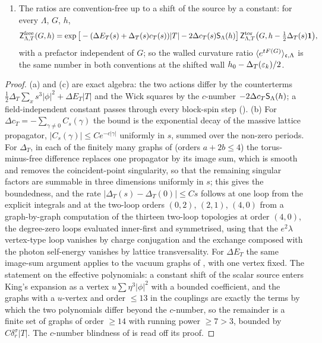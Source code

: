 \begin{proposition}
\begin{enumerate}[label=\textup{(\alph*)},leftmargin=*]
\item The ratios are convention-free up to a shift of the source by a constant: for every $\Lambda$, $G$, $h$,
\[
\mathsf Z^{\rm free}_{\Lambda,T}(G,h)=\exp\big[-(\Delta E_T(s)+\Delta_T(s)c_T(s))|T|-2\Delta c_T(s)\mathsf S_\Lambda(h)\big]\,\mathsf Z^{\rm tor}_{\Lambda,T}\big(G,h-\tfrac12\Delta_T(s)\mathbf 1\big),
\]
with a prefactor independent of $G$; so the walled curvature ratio $\langle e^{tF(G)}\rangle_{\mathfrak c,\Lambda}$ is the same number in both conventions at the shifted wall $h_0-\Delta_T(\varepsilon_k)/2$.
\end{enumerate}
\end{proposition}
\begin{proof}
(a) and (c) are exact algebra: the two actions differ by the counterterms $\frac12\Delta_T\sum_xs^3|\phi|^2+\Delta E_T|T|$ and the Wick squares by the $c$-number $-2\Delta c_T\mathsf S_\Lambda(h)$; a field-independent constant passes through every block-spin step (). (b) For $\Delta c_T=-\sum_{\gamma\ne0}C_s(\gamma)$ the bound is the exponential decay of the massive lattice propagator, $|C_s(\gamma)|\le Ce^{-c|\gamma|}$ uniformly in $s$, summed over the non-zero periods. For $\Delta_T$, in each of the finitely many graphs of \cite[(3.33)]{K1} (orders $a+2b\le4$) the torus-minus-free difference replaces one propagator by its image sum, which is smooth and removes the coincident-point singularity, so that the remaining singular factors are summable in three dimensions uniformly in $s$; this gives the boundedness, and the rate $|\Delta_T(s)-\Delta_T(0)|\le Cs$ follows at one loop from the explicit integrals and at the two-loop orders $(0,2)$, $(2,1)$, $(4,0)$ from a graph-by-graph computation of the thirteen two-loop topologies at order $(4,0)$, the degree-zero loops evaluated inner-first and symmetrised, using that the $e^2\lambda$ vertex-type loop vanishes by charge conjugation and the exchange composed with the photon self-energy vanishes by lattice transversality. For $\Delta E_T$ the same image-sum argument applies to the vacuum graphs of \cite[(3.35)]{K1}, with one vertex fixed. The statement on the effective polynomials: a constant shift of the scalar source enters King's expansion as a vertex $u\sum\eta^3|\phi|^2$ with a bounded coefficient, and the graphs with a $u$-vertex and order $\le13$ in the couplings are exactly the terms by which the two polynomials differ beyond the $c$-number, so the remainder is a finite set of graphs of order $\ge14$ with running power $\ge7>3$, bounded by $C\delta_r^\sigma|T|$. The $c$-number blindness of  is read off its proof.
\end{proof}
